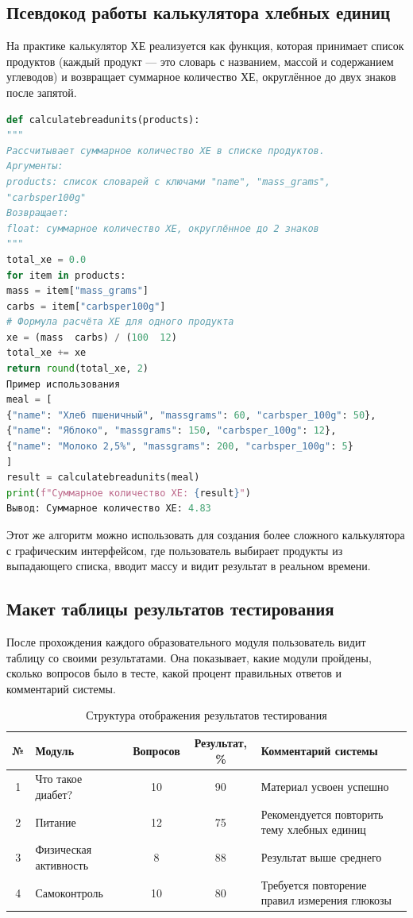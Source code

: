 \documentclass[14pt, a4paper]{extarticle}
\begin{document}
\subsection{Псевдокод работы калькулятора хлебных единиц}

\noindent На практике калькулятор ХЕ реализуется как функция, которая принимает список продуктов (каждый продукт — это словарь с названием, массой и содержанием углеводов) и возвращает суммарное количество ХЕ, округлённое до двух знаков после запятой.

\begin{lstlisting}[style=portalcode, language=Python, caption={Алгоритм расчёта хлебных единиц}]
def calculatebreadunits(products):
"""
Рассчитывает суммарное количество ХЕ в списке продуктов.
Аргументы:
products: список словарей с ключами "name", "mass_grams",
"carbsper100g"
Возвращает:
float: суммарное количество ХЕ, округлённое до 2 знаков
"""
total_xe = 0.0
for item in products:
mass = item["mass_grams"]
carbs = item["carbsper100g"]
# Формула расчёта ХЕ для одного продукта
xe = (mass  carbs) / (100  12)
total_xe += xe
return round(total_xe, 2)
Пример использования
meal = [
{"name": "Хлеб пшеничный", "massgrams": 60, "carbsper_100g": 50},
{"name": "Яблоко", "massgrams": 150, "carbsper_100g": 12},
{"name": "Молоко 2,5%", "massgrams": 200, "carbsper_100g": 5}
]
result = calculatebreadunits(meal)
print(f"Суммарное количество ХЕ: {result}")
Вывод: Суммарное количество ХЕ: 4.83
\end{lstlisting}

\noindent Этот же алгоритм можно использовать для создания более сложного калькулятора с графическим интерфейсом, где пользователь выбирает продукты из выпадающего списка, вводит массу и видит результат в реальном времени.

\subsection{Макет таблицы результатов тестирования}

\noindent После прохождения каждого образовательного модуля пользователь видит таблицу со своими результатами. Она показывает, какие модули пройдены, сколько вопросов было в тесте, какой процент правильных ответов и комментарий системы.

\begin{longtable}{|c|p{}|c|c|p{}|}
\caption{Структура отображения результатов тестирования}\\
\hline
\textbf{№} & \textbf{Модуль} & \textbf{Вопросов} & \textbf{Результат, \%} & \textbf{Комментарий системы} \\
\hline
1 & Что такое диабет? & 10 & 90 & Материал усвоен успешно \\
\hline
2 & Питание & 12 & 75 & Рекомендуется повторить тему хлебных единиц \\
\hline
3 & Физическая активность & 8 & 88 & Результат выше среднего \\
\hline
4 & Самоконтроль & 10 & 80 & Требуется повторение правил измерения глюкозы \\
\hline
\end{longtable}
\end{document}
